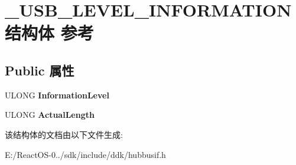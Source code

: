 \hypertarget{struct___u_s_b___l_e_v_e_l___i_n_f_o_r_m_a_t_i_o_n}{}\section{\+\_\+\+U\+S\+B\+\_\+\+L\+E\+V\+E\+L\+\_\+\+I\+N\+F\+O\+R\+M\+A\+T\+I\+O\+N结构体 参考}
\label{struct___u_s_b___l_e_v_e_l___i_n_f_o_r_m_a_t_i_o_n}
\subsection*{Public 属性}
\begin{DoxyCompactItemize}
\item 
\mbox{\label{struct___u_s_b___l_e_v_e_l___i_n_f_o_r_m_a_t_i_o_n_ae7bf559f96a2d0ebb384aa6daa428c70}} 
U\+L\+O\+NG {\bfseries Information\+Level}
\item 
\mbox{\label{struct___u_s_b___l_e_v_e_l___i_n_f_o_r_m_a_t_i_o_n_a0775051b20f780d4dd8b239d74b4f31c}} 
U\+L\+O\+NG {\bfseries Actual\+Length}
\end{DoxyCompactItemize}


该结构体的文档由以下文件生成\+:\begin{DoxyCompactItemize}
\item 
E\+:/\+React\+O\+S-\/0../sdk/include/ddk/hubbusif.\+h\end{DoxyCompactItemize}
